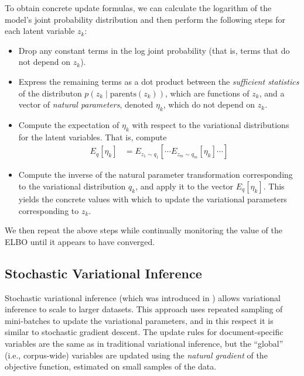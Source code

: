 \documentclass{article}
\begin{document}
To obtain concrete update formulas, we can calculate the logarithm of the model's joint probability distribution and then perform the following steps for each latent variable $z_k$:
\begin{itemize}
\item Drop any constant terms in the log joint probability (that is, terms that do not depend on $z_k$).
\item Express the remaining terms as a dot product between the \emph{sufficient statistics} of the distributon $p(z_k \mid \text{parents}(z_k))$, which are functions of $z_k$, and a vector of \emph{natural parameters}, denoted $\eta_k$, which do not depend on $z_k$.
\item Compute the expectation of $\eta_k$ with respect to the variational distributions for the latent variables.
That is, compute
\begin{align}
E_q[\eta_k] &= E_{z_1 \sim q_1} \left[ \cdots E_{z_m \sim q_m} \left[ \eta_k \right] \cdots \right]
\end{align}
\item Compute the inverse of the natural parameter transformation corresponding to the variational distribution $q_k$, and apply it to the vector $E_q[\eta_k]$.
This yields the concrete values with which to update the variational parameters corresponding to $z_k$.
\end{itemize}
We then repeat the above steps while continually monitoring the value of the ELBO until it appears to have converged.


\subsection{Stochastic Variational Inference}
\label{sec:svi}

Stochastic variational inference (which was introduced in \cite{hoffman2013stochastic}) allows variational inference to scale to larger datasets.
This approach uses repeated sampling of mini-batches to update the variational parameters, and in this respect it is similar to stochastic gradient descent.
The update rules for document-specific variables are the same as in traditional variational inference, but the ``global'' (i.e., corpus-wide) variables are updated using the \emph{natural gradient} of the objective function, estimated on small samples of the data.
\end{document}

